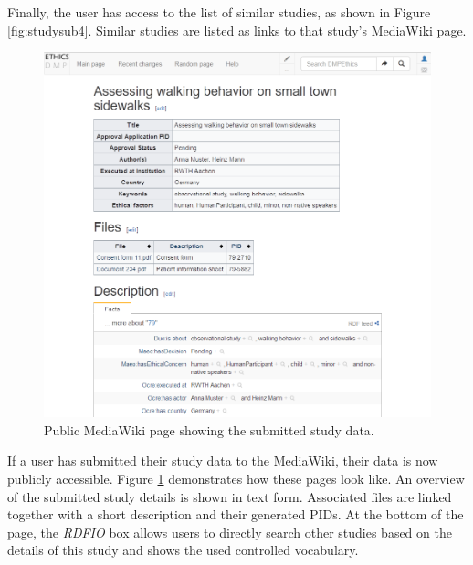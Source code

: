 \documentclass[10pt]{article}
\begin{document}
Finally, the user has access to the list of similar studies, as shown in Figure \ref{fig:studysub4}. Similar studies are listed as links to that study's MediaWiki page. \\

\begin{figure}[H]
\centering
	\includegraphics[width=1\textwidth]{img/wikipage.png}
	\caption{Public MediaWiki page showing the submitted study data.}
	\label{fig:wikipage}
\end{figure}

If a user has submitted their study data to the MediaWiki, their data is now publicly accessible. Figure \ref{fig:wikipage} demonstrates how these pages look like. An overview of the submitted study details is shown in text form. Associated files are linked together with a short description and their generated PIDs. At the bottom of the page, the \textit{RDFIO} box allows users to directly search other studies based on the details of this study and shows the used controlled vocabulary. 
\end{document}
